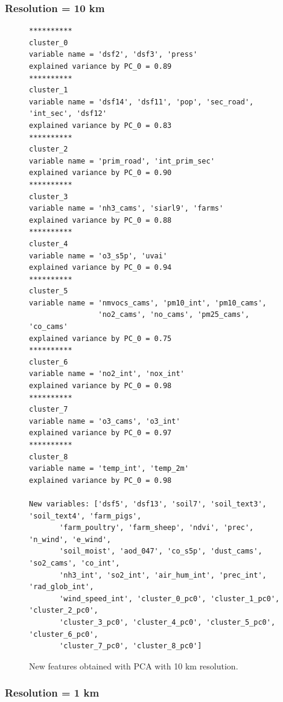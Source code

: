 \subsubsection{Resolution = 10 km}
\begin{figure}[H]
\begin{verbatim}
**********
cluster_0
variable name = 'dsf2', 'dsf3', 'press'
explained variance by PC_0 = 0.89
**********
cluster_1
variable name = 'dsf14', 'dsf11', 'pop', 'sec_road', 'int_sec', 'dsf12'
explained variance by PC_0 = 0.83
**********
cluster_2
variable name = 'prim_road', 'int_prim_sec'
explained variance by PC_0 = 0.90
**********
cluster_3
variable name = 'nh3_cams', 'siarl9', 'farms'
explained variance by PC_0 = 0.88
**********
cluster_4
variable name = 'o3_s5p', 'uvai'
explained variance by PC_0 = 0.94
**********
cluster_5
variable name = 'nmvocs_cams', 'pm10_int', 'pm10_cams',    
                'no2_cams', 'no_cams', 'pm25_cams', 'co_cams'
explained variance by PC_0 = 0.75
**********
cluster_6
variable name = 'no2_int', 'nox_int'
explained variance by PC_0 = 0.98
**********
cluster_7
variable name = 'o3_cams', 'o3_int'
explained variance by PC_0 = 0.97
**********
cluster_8
variable name = 'temp_int', 'temp_2m'
explained variance by PC_0 = 0.98

New variables: ['dsf5', 'dsf13', 'soil7', 'soil_text3', 'soil_text4', 'farm_pigs',
       'farm_poultry', 'farm_sheep', 'ndvi', 'prec', 'n_wind', 'e_wind',
       'soil_moist', 'aod_047', 'co_s5p', 'dust_cams', 'so2_cams', 'co_int',
       'nh3_int', 'so2_int', 'air_hum_int', 'prec_int', 'rad_glob_int',
       'wind_speed_int', 'cluster_0_pc0', 'cluster_1_pc0', 'cluster_2_pc0',
       'cluster_3_pc0', 'cluster_4_pc0', 'cluster_5_pc0', 'cluster_6_pc0',
       'cluster_7_pc0', 'cluster_8_pc0']
\end{verbatim}
\caption{New features obtained with PCA with 10 km resolution.}
\label{pca01}
\end{figure}
\pagebreak
\subsubsection{Resolution = 1 km}

